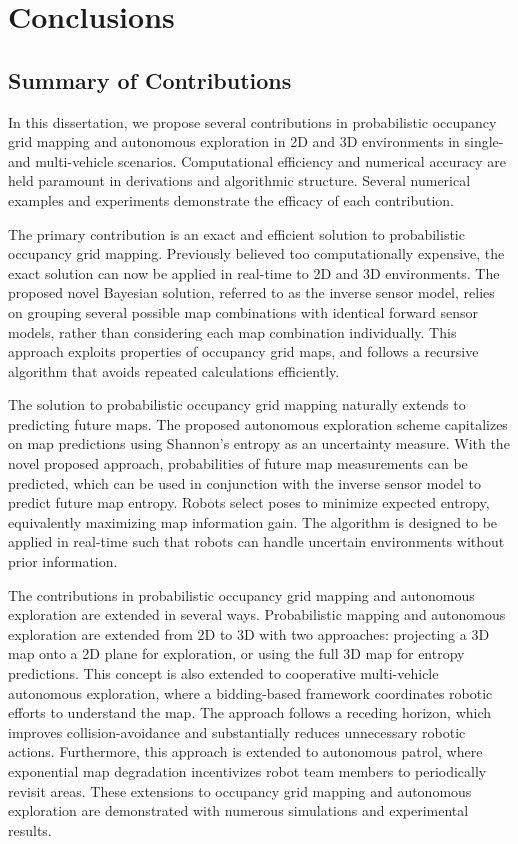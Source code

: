 \chapter{Conclusions}\label{chap:Conclusions}

\section{Summary of Contributions}
In this dissertation, we propose several contributions in probabilistic occupancy grid mapping and autonomous exploration in 2D and 3D environments in single- and multi-vehicle scenarios. Computational efficiency and numerical accuracy are held paramount in derivations and algorithmic structure. Several numerical examples and experiments demonstrate the efficacy of each contribution.

The primary contribution is an exact and efficient solution to probabilistic occupancy grid mapping. Previously believed too computationally expensive, the exact solution can now be applied in real-time to 2D and 3D environments. The proposed novel Bayesian solution, referred to as the inverse sensor model, relies on grouping several possible map combinations with identical forward sensor models, rather than considering each map combination individually. This approach exploits properties of occupancy grid maps, and follows a recursive algorithm that avoids repeated calculations efficiently.

The solution to probabilistic occupancy grid mapping naturally extends to predicting future maps. The proposed autonomous exploration scheme capitalizes on map predictions using Shannon's entropy as an uncertainty measure. With the novel proposed approach, probabilities of future map measurements can be predicted, which can be used in conjunction with the inverse sensor model to predict future map entropy. Robots select poses to minimize expected entropy, equivalently maximizing map information gain. The algorithm is designed to be applied in real-time such that robots can handle uncertain environments without prior information.

The contributions in probabilistic occupancy grid mapping and autonomous exploration are extended in several ways. Probabilistic mapping and autonomous exploration are extended from 2D to 3D with two approaches: projecting a 3D map onto a 2D plane for exploration, or using the full 3D map for entropy predictions. This concept is also extended to cooperative multi-vehicle autonomous exploration, where a bidding-based framework coordinates robotic efforts to understand the map. The approach follows a receding horizon, which improves collision-avoidance and substantially reduces unnecessary robotic actions. Furthermore, this approach is extended to autonomous patrol, where exponential map degradation incentivizes robot team members to periodically revisit areas. These extensions to occupancy grid mapping and autonomous exploration are demonstrated with numerous simulations and experimental results.

